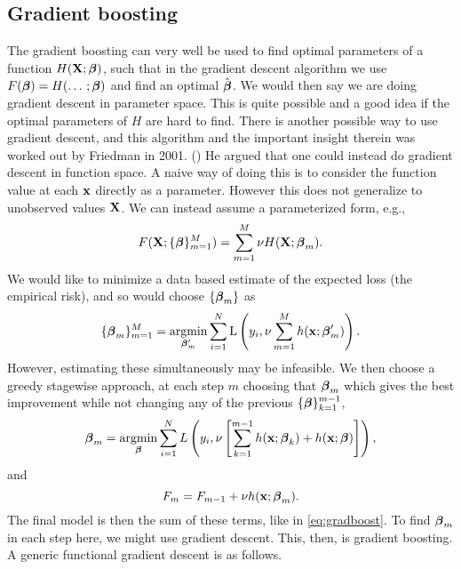 \subsection{Gradient boosting}
The gradient boosting can very well be used to find optimal parameters of a function $H(\mathbf{X};\boldsymbol{\beta})$, such that in the gradient descent algorithm we use $F(\boldsymbol{\beta})=H(\dotsc;\boldsymbol{\beta})$ and find an optimal $\hat{\boldsymbol{\beta}}$. We would then say we are doing gradient descent in parameter space. This is quite possible and a good idea if the optimal parameters of $H$ are hard to find. There is another possible way to use gradient descent, and this algorithm and the important insight therein was worked out by Friedman in 2001. (\cite{friedman2001}) He argued that one could instead do gradient descent in function space. A naive way of doing this is to consider the function value at each $\mathbf{x}$ directly as a parameter. However this does not generalize to unobserved values $\mathbf{X}$. We can instead assume a parameterized form, e.g.,
\begin{equation}\label{eq:gradboost}
    F(\mathbf{X};\{\boldsymbol{\beta}\}_{m=1}^M)=\sum_{m=1}^M\nu H(\mathbf{X};\boldsymbol{\beta}_m).
\end{equation}
We would like to minimize a data based estimate of the expected loss (the empirical risk), and so would choose $\{\boldsymbol{\beta}_m\}$ as
\begin{equation}
    \{\boldsymbol{\beta}_m\}_{m=1}^M=\operatorname*{argmin}_{\boldsymbol{\beta}_m^\prime}\sum_{i=1}^N\operatorname{L}\left(y_i,\nu\sum_{m=1}^Mh(\mathbf{x};\boldsymbol{\beta}_m^\prime)\right).
\end{equation}
However, estimating these simultaneously may be infeasible. We then choose a greedy stagewise approach, at each step $m$ choosing that $\boldsymbol{\beta}_m$ which gives the best improvement while not changing any of the previous $\{\boldsymbol{\beta}\}_{k=1}^{m-1}$,
\begin{equation}
    \boldsymbol{\beta}_m=\operatorname*{argmin}_{\boldsymbol{\beta}}\sum_{i=1}^NL\left(y_i,\nu\left[\sum_{k=1}^{m-1}h(\mathbf{x};\boldsymbol{\beta}_k)+h(\mathbf{x};\boldsymbol{\beta})\right]\right),
\end{equation}
and
\begin{equation}
    F_{m}=F_{m-1}+\nu h(\mathbf{x};\boldsymbol{\beta}_m).
\end{equation}
The final model is then the sum of these terms, like in \eqref{eq:gradboost}. To find $\boldsymbol{\beta}_m$ in each step here, we might use gradient descent. This, then, is gradient boosting. A generic functional gradient descent is as follows.
